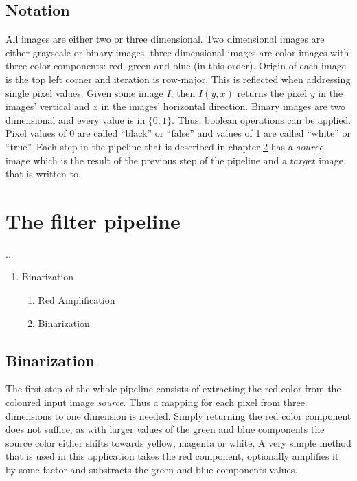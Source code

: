 \documentclass{report}
\begin{document}
\section{Notation}

All images are either two or three dimensional. Two dimensional images
are either grayscale or binary images, three dimensional images are
color images with three color components: red, green and blue (in this
order). Origin of each image is the top left corner and iteration is
row-major. This is reflected when addressing single pixel
values. Given some image \( I \), then \( I(y, x) \) returns the pixel
\( y \) in the images' vertical and \( x \) in the images' horizontal
direction. Binary images are two dimensional and every value is in
\(\{ 0, 1 \}\). Thus, boolean operations can be applied. Pixel values
of 0 are called ``black'' or ``false'' and values of 1 are called
``white'' or ``true''. Each step in the pipeline that is described in
chapter \ref{chap:pipeline} has a \( source \) image which is the
result of the previous step of the pipeline and a \( target \) image
that is written to.


\pagebreak
\chapter{The filter pipeline}
\label{chap:pipeline}
...

\begin{enumerate}
\item Binarization

  \begin{enumerate}
  \item Red Amplification
  \item Binarization
  \end{enumerate}

\end{enumerate}


\section{Binarization}

The first step of the whole pipeline consists of extracting the red
color from the coloured input image \textit{source}. Thus a mapping
for each pixel from three dimensions to one dimension is
needed. Simply returning the red color component does not suffice, as
with larger values of the green and blue components the source color
either shifts towards yellow, magenta or white. A very simple method
that is used in this application takes the red component, optionally
amplifies it by some factor and substracts the green and blue
components values.
\end{document}
